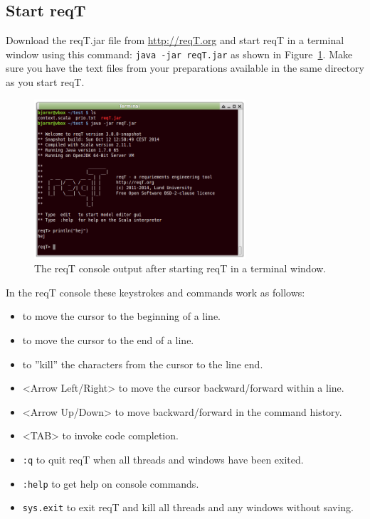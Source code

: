 \documentclass[11pt]{article}
\begin{document}
\subsection{Start reqT}
Download the reqT.jar file from \url{http://reqT.org} and start reqT in a terminal window using this command: \verb+java -jar reqT.jar+ as shown in Figure~\ref{fig:console}. Make sure you have the text files from your preparations available in the same directory as you start reqT.

\begin{figure}[h]
    \centering
    \includegraphics[width=0.7\textwidth]{console.png}
    \caption{The reqT console output after starting reqT in a terminal window.}
    \label{fig:console}
\end{figure}

In the reqT console these keystrokes and commands work as follows:
{\footnotesize 
\begin{itemize}[label={}]
\item <Ctrl+A> to move the cursor to the beginning of a line.
\item <Ctrl+E> to move the cursor to the end of a line.
\item <Ctrl+K> to ''kill'' the characters from the cursor to the line end.
\item <Arrow Left/Right> to move the cursor backward/forward within a line. 
\item <Arrow Up/Down> to move backward/forward in the command history. 
\item <TAB> to invoke code completion.
\item \verb+:q+ to quit reqT when all threads and windows have been exited.
\item \verb+:help+ to get help on console commands.
\item \verb+sys.exit+ to exit reqT and kill all threads and any windows without saving.
\end{itemize}
}
\end{document}
